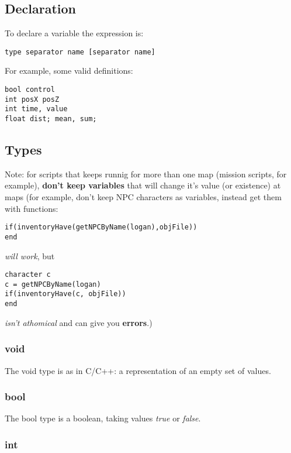 \documentclass[ letterpaper,12pt]{article}
\begin{document}
\subsection{Declaration}

To declare a variable the expression is:

\begin{verbatim}
type separator name [separator name]
\end{verbatim}

For example, some valid definitions:

\begin{verbatim}
bool control
int posX posZ
int time, value
float dist; mean, sum;
\end{verbatim}

\subsection{Types}

Note: for scripts that keeps runnig for more than one map (mission scripts, for
example), {\bf don't keep variables} that will change it's value (or existence)
at maps (for example, don't keep NPC characters as variables, instead get them
with functions:

\begin{verbatim}
if(inventoryHave(getNPCByName(logan),objFile))
end
\end{verbatim}

{\it will work}, but

\begin{verbatim}
character c
c = getNPCByName(logan)
if(inventoryHave(c, objFile))
end
\end{verbatim}

{\it isn't athomical} and can give you {\bf errors}.)

\subsubsection{void}

The void type is as in C/C++: a representation of an empty set of values.

\subsubsection{bool}

The bool type is a boolean, taking values {\it true} or {\it false}.

\subsubsection{int}
\end{document}
